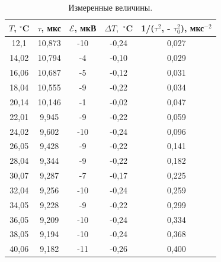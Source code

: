 \documentclass[a4paper,12pt]{article} %
\begin{document}
	\begin{table}[H]
		\caption{Измеренные величины.}
		\label{table:results}
		\begin{tabular}{|c|c|c|c|c|}
			\hline
			$T$, $^\circ$C & $\tau$, мкс & $\mathscr{E}$, мкВ & $\Delta T,$ $^\circ$C & 1/($\tau^2$, - $\tau_0^2$), мкс$^{-2}$ \\ \hline
			12,1           & 10,873      & -10                & -0,24                 & 0,027                                  \\ \hline
			14,02          & 10,794      & -4                 & -0,10                 & 0,029                                  \\ \hline
			16,06          & 10,687      & -5                 & -0,12                 & 0,031                                  \\ \hline
			18,04          & 10,555      & -9                 & -0,22                 & 0,034                                  \\ \hline
			20,14          & 10,146      & -1                 & -0,02                 & 0,047                                  \\ \hline
			22,01          & 9,945       & -9                 & -0,22                 & 0,059                                  \\ \hline
			24,02          & 9,602       & -10                & -0,24                 & 0,096                                  \\ \hline
			26,05          & 9,428       & -9                 & -0,22                 & 0,141                                  \\ \hline
			28,04          & 9,344       & -9                 & -0,22                 & 0,182                                  \\ \hline
			30,07          & 9,287       & -7                 & -0,17                 & 0,225                                  \\ \hline
			32,04          & 9,256       & -10                & -0,24                 & 0,259                                  \\ \hline
			34,05          & 9,228       & -9                 & -0,22                 & 0,299                                  \\ \hline
			36,05          & 9,209       & -10                & -0,24                 & 0,334                                  \\ \hline
			38,05          & 9,194       & -10                & -0,24                 & 0,368                                  \\ \hline
			40,06          & 9,182       & -11                & -0,26                 & 0,400                                  \\ \hline
		\end{tabular}
	\end{table}
\end{document}
